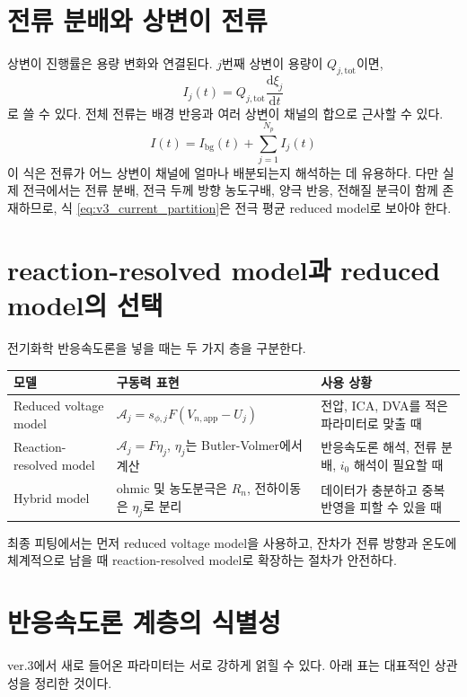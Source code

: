 \documentclass[11pt,a4paper]{article}
\newcommand{\dd}{\mathrm{d}}
\newcommand{\app}{\mathrm{app}}
\newcommand{\tot}{\mathrm{tot}}
\newcommand{\bg}{\mathrm{bg}}
\begin{document}
\section{전류 분배와 상변이 전류}
상변이 진행률은 용량 변화와 연결된다. \(j\)번째 상변이 용량이 \(Q_{j,\tot}\)이면,
\begin{equation}
I_j(t)=Q_{j,\tot}\frac{\dd\xi_j}{\dd t}
\label{eq:v3_Ij}
\end{equation}
로 쓸 수 있다. 전체 전류는 배경 반응과 여러 상변이 채널의 합으로 근사할 수 있다.
\begin{equation}
I(t)=I_{\bg}(t)+\sum_{j=1}^{N_p}I_j(t)
\label{eq:v3_current_partition}
\end{equation}
이 식은 전류가 어느 상변이 채널에 얼마나 배분되는지 해석하는 데 유용하다. 다만 실제 전극에서는 전류 분배, 전극 두께 방향 농도구배, 양극 반응, 전해질 분극이 함께 존재하므로, 식 \eqref{eq:v3_current_partition}은 전극 평균 reduced model로 보아야 한다.

\section{reaction-resolved model과 reduced model의 선택}
전기화학 반응속도론을 넣을 때는 두 가지 층을 구분한다.

\begin{longtable}{p{}p{}p{}}
\toprule
모델 & 구동력 표현 & 사용 상황 \\
\midrule
\endhead
Reduced voltage model & \(\mathcal A_j=s_{\phi,j}F(V_{n,\app}-U_j)\) & 전압, ICA, DVA를 적은 파라미터로 맞출 때 \\
Reaction-resolved model & \(\mathcal A_j=F\eta_j\), \(\eta_j\)는 Butler-Volmer에서 계산 & 반응속도론 해석, 전류 분배, \(i_0\) 해석이 필요할 때 \\
Hybrid model & ohmic 및 농도분극은 \(R_n\), 전하이동은 \(\eta_j\)로 분리 & 데이터가 충분하고 중복 반영을 피할 수 있을 때 \\
\bottomrule
\end{longtable}

최종 피팅에서는 먼저 reduced voltage model을 사용하고, 잔차가 전류 방향과 온도에 체계적으로 남을 때 reaction-resolved model로 확장하는 절차가 안전하다.

\section{반응속도론 계층의 식별성}
ver.3에서 새로 들어온 파라미터는 서로 강하게 얽힐 수 있다. 아래 표는 대표적인 상관성을 정리한 것이다.
\end{document}
